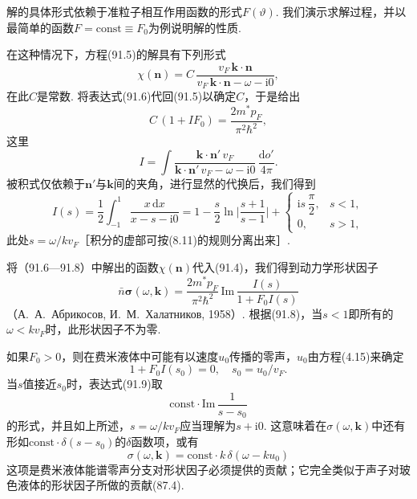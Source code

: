 解的具体形式依赖于准粒子相互作用函数的形式$F(\vartheta)$. 我们演示求解过程，并以最简单的函数$F=\mathrm{const}\equiv F_{0}$为例说明解的性质.

在这种情况下，方程(91.5)的解具有下列形式
\begin{equation}
\chi(\bm{n})=C\,\frac{v_{F}\,\bm{k}\cdot\bm{n}}{v_{F}\,\bm{k}\cdot\bm{n}-\omega-\mathrm{i}0},
\end{equation}
在此$C$是常数. 将表达式(91.6)代回(91.5)以确定$C$，于是给出
\begin{equation}
C\,(1+IF_{0})=\frac{2m^{*}p_{F}}{\pi^{2}\hbar^{2}},
\end{equation}
这里
\begin{equation*}
I=\int\frac{\bm{k}\cdot\bm{n}'\,v_{F}}{\bm{k}\cdot\bm{n}'\,v_{F}-\omega-\mathrm{i}0}\,\frac{\mathrm{d}o'}{4\pi}.
\end{equation*}
被积式仅依赖于$\bm{n}'$与$\bm{k}$间的夹角，进行显然的代换后，我们得到
\begin{equation}
I(s)=\frac{1}{2}\int^{1}_{-1}\frac{x\,\mathrm{d}x}{x-s-\mathrm{i}0}=1-\frac{s}{2}\ln\biggl|\frac{s+1}{s-1}\biggr|+
\begin{cases}
\mathrm{i}s\,\dfrac{\pi}{2}, & s<1,\\[0.5em]
0, & s>1,
\end{cases}
\end{equation}
此处$s=\omega/kv_{F}$［积分的虚部可按(8.11)的规则分离出来］.

将（91.6—91.8）中解出的函数$\chi(\bm{n})$代入(91.4)，我们得到动力学形状因子
\begin{equation}
\bar{n}\bm{\sigma}(\omega,\bm{k})=\frac{2m^{*}p_{F}}{\pi^{2}\hbar^{2}}\,\mathrm{Im}\,\frac{I(s)}{1+F_{0}I(s)}
\end{equation}
（А.~А.~Абрикосов, И.~М.~Халатников, 1958）. 根据(91.8)，当$s<1$即所有的$\omega<kv_{F}$时，此形状因子不为零.

如果$F_{0}>0$，则在费米液体中可能有以速度$u_{0}$传播的零声，$u_{0}$由方程(4.15)来确定
\begin{equation*}
1+F_{0}I(s_{0})=0,\quad s_{0}=u_{0}/v_{F}.
\end{equation*}
当$s$值接近$s_{0}$时，表达式(91.9)取
\begin{equation*}
\mathrm{const}\cdot\mathrm{Im}\,\frac{1}{s-s_{0}}
\end{equation*}
的形式，并且如上所述，$s=\omega/kv_{F}$应当理解为$s+\mathrm{i}0$. 这意味着在$\sigma(\omega,\bm{k})$中还有形如$\mathrm{const}\cdot\delta(s-s_{0})$的$\delta$函数项，或有
\begin{equation}
\sigma(\omega,\bm{k})=\mathrm{const}\cdot k\,\delta(\omega-ku_{0})
\end{equation}
这项是费米液体能谱零声分支对形状因子必须提供的贡献；它完全类似于声子对玻色液体的形状因子所做的贡献(87.4).


